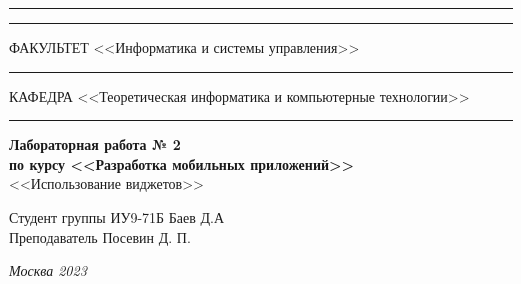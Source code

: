 \documentclass[a4paper, 14pt]{extarticle}
\begin{document}
\begin{titlepage}
\vspace{-25pt}
\hspace{-35pt}\rule{\textwidth}{2.3pt}

\vspace*{-20.3pt}
\hspace{-35pt}\rule{\textwidth}{0.4pt}

\vspace{1.5ex}
\hspace{-35pt} \noindent \small ФАКУЛЬТЕТ\hspace{80pt} <<Информатика и системы управления>>

\vspace*{-16pt}
\hspace{47pt}\rule{0.83\textwidth}{0.4pt}

\vspace{0.5ex}
\hspace{-35pt} \noindent \small КАФЕДРА\hspace{50pt} <<Теоретическая информатика и компьютерные технологии>>

\vspace*{-16pt}
\hspace{30pt}\rule{0.866\textwidth}{0.4pt}
  
\vspace{11em}

\begin{center}
\Large {\bf Лабораторная работа № 2 } \\ 
\large {\bf по курсу <<Разработка мобильных приложений>>} \\
\large <<Использование виджетов>> 
\end{center}\normalsize

\vspace{8em}


\begin{flushright}
  {Студент группы ИУ9-71Б Баев Д.А \hspace*{15pt}\\ 
  \vspace{2ex}
  Преподаватель Посевин Д. П.\hspace*{15pt}}
\end{flushright}

\bigskip

\vfill
 

\begin{center}
\textsl{Москва 2023}
\end{center}
\end{titlepage}
\end{document}

